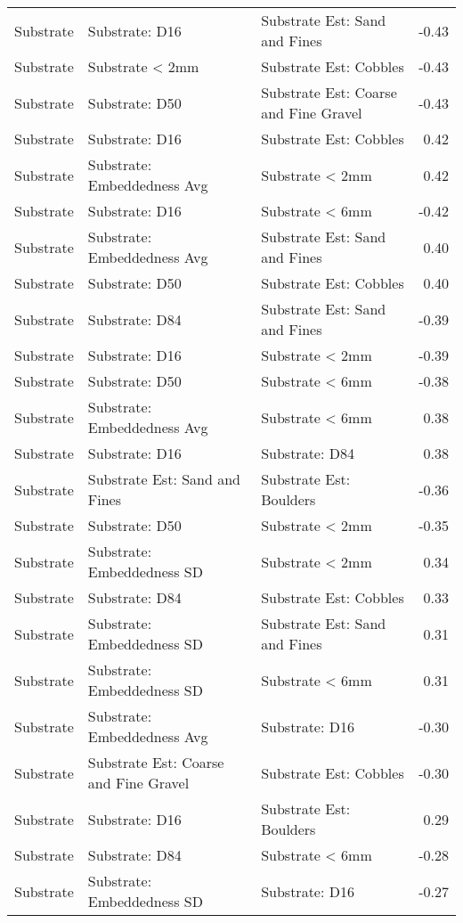 \documentclass[
  12pt,
]{article}
\begin{document}
\begin{longtable}[t]{>{\raggedright\arraybackslash}p{1in}>{\raggedright\arraybackslash}p{2in}>{\raggedright\arraybackslash}p{2in}r}
Substrate & Substrate: D16 & Substrate Est: Sand and Fines & -0.43\\
\addlinespace
Substrate & Substrate < 2mm & Substrate Est: Cobbles & -0.43\\
Substrate & Substrate: D50 & Substrate Est: Coarse and Fine Gravel & -0.43\\
Substrate & Substrate: D16 & Substrate Est: Cobbles & 0.42\\
Substrate & Substrate: Embeddedness Avg & Substrate < 2mm & 0.42\\
Substrate & Substrate: D16 & Substrate < 6mm & -0.42\\
\addlinespace
Substrate & Substrate: Embeddedness Avg & Substrate Est: Sand and Fines & 0.40\\
Substrate & Substrate: D50 & Substrate Est: Cobbles & 0.40\\
Substrate & Substrate: D84 & Substrate Est: Sand and Fines & -0.39\\
Substrate & Substrate: D16 & Substrate < 2mm & -0.39\\
Substrate & Substrate: D50 & Substrate < 6mm & -0.38\\
\addlinespace
Substrate & Substrate: Embeddedness Avg & Substrate < 6mm & 0.38\\
Substrate & Substrate: D16 & Substrate: D84 & 0.38\\
Substrate & Substrate Est: Sand and Fines & Substrate Est: Boulders & -0.36\\
Substrate & Substrate: D50 & Substrate < 2mm & -0.35\\
Substrate & Substrate: Embeddedness SD & Substrate < 2mm & 0.34\\
\addlinespace
Substrate & Substrate: D84 & Substrate Est: Cobbles & 0.33\\
Substrate & Substrate: Embeddedness SD & Substrate Est: Sand and Fines & 0.31\\
Substrate & Substrate: Embeddedness SD & Substrate < 6mm & 0.31\\
Substrate & Substrate: Embeddedness Avg & Substrate: D16 & -0.30\\
Substrate & Substrate Est: Coarse and Fine Gravel & Substrate Est: Cobbles & -0.30\\
\addlinespace
Substrate & Substrate: D16 & Substrate Est: Boulders & 0.29\\
Substrate & Substrate: D84 & Substrate < 6mm & -0.28\\
Substrate & Substrate: Embeddedness SD & Substrate: D16 & -0.27\\

\end{longtable}
\end{document}

